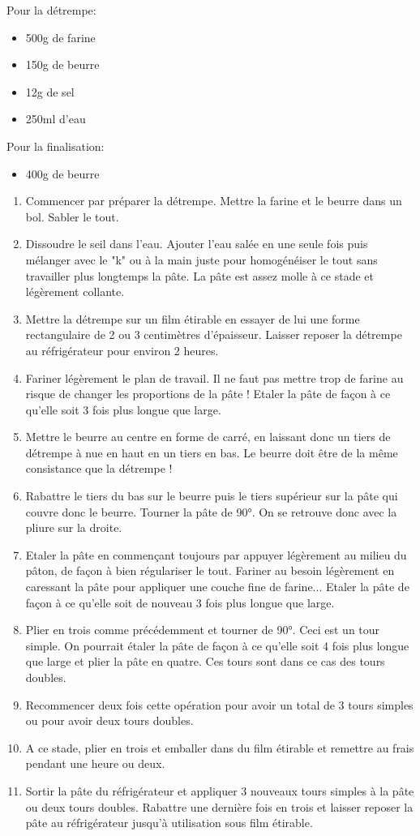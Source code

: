 \bigskip
{}
{}{Pour la détrempe:
\begin{itemize}
	\item 500g de farine
	\item 150g de beurre
	\item 12g de sel
	\item 250ml d'eau
\end{itemize}

Pour la finalisation:
\begin{itemize}
	\item 400g de beurre
\end{itemize}}
{\begin{enumerate}
	\item Commencer par préparer la détrempe. Mettre la farine et le beurre dans un bol. Sabler le tout.
	\item Dissoudre le seil dans l'eau. Ajouter l'eau salée en une seule fois puis mélanger avec le "k" ou à la main juste pour homogénéiser le tout sans travailler plus longtemps la pâte. La pâte est assez molle à ce stade et légèrement collante. 
	\item Mettre la détrempe sur un film étirable en essayer de lui une forme rectangulaire de 2 ou 3 centimètres d'épaisseur. Laisser reposer la détrempe au réfrigérateur pour environ 2 heures. 
	\item Fariner légèrement le plan de travail. Il ne faut pas mettre trop de farine au risque de changer les proportions de la pâte ! Etaler la pâte de façon à ce qu'elle soit 3 fois plus longue que large.  
	\item Mettre le beurre au centre en forme de carré, en laissant donc un tiers de détrempe à nue en haut en un tiers en bas. Le beurre doit être de la même consistance que la détrempe !
	\item Rabattre le tiers du bas sur le beurre puis le tiers supérieur sur la pâte qui couvre donc le beurre. Tourner la pâte de 90°. On se retrouve donc avec la pliure sur la droite.
	\item Etaler la pâte en commençant toujours par  appuyer légèrement au milieu du pâton, de façon à bien régulariser le tout. Fariner au besoin légèrement en caressant la pâte pour appliquer une couche fine de farine... Etaler la pâte de façon à ce qu'elle soit de nouveau 3 fois plus longue que large. 
	\item Plier en trois comme précédemment et tourner de 90°. Ceci est un tour simple. On pourrait étaler la pâte de façon à ce qu'elle soit 4 fois plus longue que large et plier la pâte en quatre. Ces tours sont dans ce cas des tours doubles.
	\item Recommencer deux fois cette opération pour avoir un total de 3 tours simples ou pour avoir deux tours doubles.
	\item A ce stade, plier en trois et emballer dans du film étirable et remettre au frais pendant une heure ou deux. 
	\item Sortir la pâte du réfrigérateur et appliquer 3 nouveaux tours simples à la pâte ou deux tours doubles. Rabattre une dernière fois en trois et laisser reposer la pâte au réfrigérateur jusqu'à utilisation sous film étirable.
\end{enumerate}}
